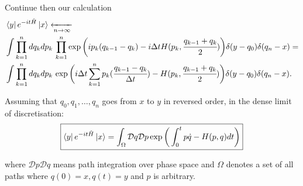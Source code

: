 \documentclass[main.tex]{subfiles}
\begin{document}
Continue then our calculation
\begin{align*}
& \bra{y}e^{-it\hat{H}}\ket{x} \xleftarrow[n \to \infty]{} \\
& \int \prod_{k=1}^n dq_k dp_k\, \prod_{k=1}^n
\exp\bigg(ip_k(q_{k-1} - q_k)- i\Delta t H(p_k, \cfrac{q_{k-1} + q_k}{2})\bigg)
\delta(y - q_0)\delta(q_n - x) = \\
& \int \prod_{k=1}^n dq_k dp_k\, 
\exp\bigg(i\Delta t \sum_{k=1}^n p_k(\cfrac{q_{k-1} - q_k}{\Delta t})- H(p_k, \cfrac{q_{k-1} + q_k}{2})\bigg)
\delta(y - q_0)\delta(q_n - x).
\end{align*}

Assuming that $q_0, q_1, \dots, q_n$ goes from $x$ to $y$ in reversed order, in the dense limit of discretisation:
\begin{equation}
\boxed{
\bra{y}e^{-it\hat{H}}\ket{x}  = 
\int_{\Omega} \mathcal{D} q \mathcal{D} p \exp \bigg(\int_0^t p \dot{q} - H(p, q) dt\bigg)
}
\end{equation} 

where $\mathcal{D} p \mathcal{D} q$ means path integration over phase space and $\Omega$ denotes a set of all paths where $q(0) = x, q(t) = y$ and $p$ is arbitrary.
\end{document}

